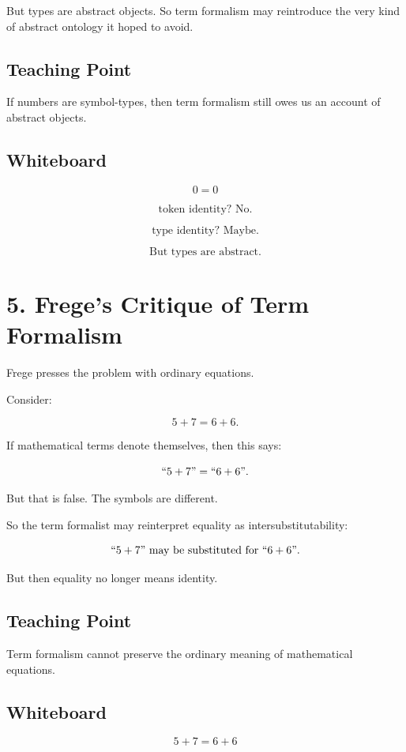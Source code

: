 \documentclass[11pt]{article}
\begin{document}
But types are abstract objects. So term formalism may reintroduce the very kind of
abstract ontology it hoped to avoid.

\subsection*{Teaching Point}

If numbers are symbol-types, then term formalism still owes us an account of abstract
objects.

\subsection*{Whiteboard}

\[
0=0
\]

\[
\text{token identity? No.}
\]

\[
\text{type identity? Maybe.}
\]

\[
\text{But types are abstract.}
\]

\section*{5. Frege's Critique of Term Formalism}

Frege presses the problem with ordinary equations.

Consider:

\[
5+7=6+6.
\]

If mathematical terms denote themselves, then this says:

\[
``5+7" = ``6+6".
\]

But that is false. The symbols are different.

So the term formalist may reinterpret equality as intersubstitutability:

\[
``5+7" \text{ may be substituted for } ``6+6".
\]

But then equality no longer means identity.

\subsection*{Teaching Point}

Term formalism cannot preserve the ordinary meaning of mathematical equations.

\subsection*{Whiteboard}

\[
5+7=6+6
\]
\end{document}
